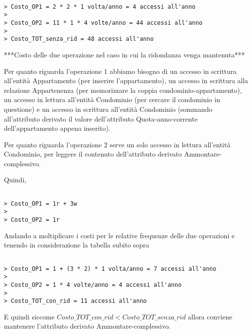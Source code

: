 \begin{verbatim}
	
> Costo_OP1 = 2 * 2 * 1 volta/anno = 4 accessi all'anno
> 
> Costo_OP2 = 11 * 1 * 4 volte/anno = 44 accessi all'anno
>
> Costo_TOT_senza_rid = 48 accessi all'anno

\end{verbatim}

***Costo delle due operazione nel caso in cui la ridondanza venga mantenuta***

Per quanto riguarda l'operazione 1 abbiamo bisogno di un accesso in scrittura all'entità Appartamento (per inserire l'appartamento), un accesso in scrittura alla relazione Appartenenza (per memorizzare la coppia condominio-appartamento), un accesso in lettura all'entità Condominio (per cercare il condominio in questione) e un accesso in scrittura all'entità Condominio (sommando all'attributo derivato il valore dell'attributo Quota-anno-corrente dell'appartamento appena inserito).

Per quanto riguarda l'operazione 2 serve un solo accesso in lettura all'entità Condominio, per leggere il contenuto dell'attributo derivato Ammontare-complessivo.

Quindi,

\begin{verbatim}

> Costo_OP1 = 1r + 3w
> 
> Costo_OP2 = 1r

\end{verbatim}

Andando a moltiplicare i costi per le relative frequenze delle due operazioni e tenendo in considerazione la tabella subito sopra

\begin{verbatim}
	
> Costo_OP1 = 1 + (3 * 2) * 1 volta/anno = 7 accessi all'anno
> 
> Costo_OP2 = 1 * 4 volte/anno = 4 accessi all'anno
>
> Costo_TOT_con_rid = 11 accessi all'anno

\end{verbatim}

E quindi siccome $Costo\_TOT\_con\_rid < Costo\_TOT\_senza\_rid$ allora conviene mantenere l'attributo derivato Ammontare-complessivo.